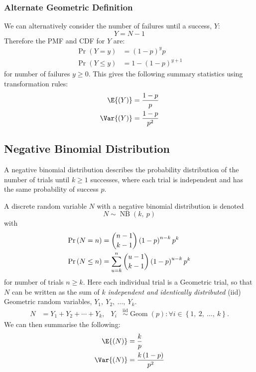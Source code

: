 \documentclass{article}
\begin{document}
\begin{multicols}{3}
    \subsubsection{Alternate Geometric Definition}
    We can alternatively consider the number of failures until a success, \(Y\):
    \begin{equation*}
        Y = N - 1
    \end{equation*}
    Therefore the PMF and CDF for \(Y\) are:
    \begin{align*}
        \Pr{\left( Y = y \right)}    & = \left( 1 - p \right)^y p         \\
        \Pr{\left( Y \leq y \right)} & = 1 - \left( 1 - p \right)^{y + 1}
    \end{align*}
    for number of failures \(y \geq 0\). This gives the following summary statistics using
    transformation rules:
    \begin{align*}
        \E{\left( Y \right)}   & = \frac{1 - p}{p}   \\
        \Var{\left( Y \right)} & = \frac{1 - p}{p^2}
    \end{align*}
    \subsection{Negative Binomial Distribution}
    A negative binomial distribution describes the probability distribution of the number of trials until \(k \geq 1\)
    successes, where each trial is independent and has the same probability of success \(p\).

    A discrete random variable \(N\) with a negative binomial distribution is denoted
    \begin{equation*}
        N \sim \operatorname{NB}{\left( k,\: p \right)}
    \end{equation*}
    with
    \begin{align*}
        \Pr{\left( N = n \right)}    & = \dbinom{n - 1}{k - 1} \left( 1 - p \right)^{n - k} p^k                \\
        \Pr{\left( N \leq n \right)} & = \sum_{u = k}^n \dbinom{u - 1}{k - 1} \left( 1 - p \right)^{u - k} p^k
    \end{align*}
    for number of trials \(n \geq k\).
    Here each individual trial is a Geometric trial, so that \(N\) can be written as the sum of
    \(k\) \textit{independent and identically distributed} (iid) Geometric random variables, \(Y_1,\: Y_2,\: \dots,\: Y_k\).
    \begin{align*}
        N & = Y_1 + Y_2 + \cdots + Y_k, & Y_i & \overset{\mathrm{iid}}{\sim} \operatorname{Geom}{\left( p \right)} : \forall i \in \left\{ 1,\: 2,\: \dots,\: k \right\}.
    \end{align*}
    We can then summarise the following:
    \begin{align*}
        \E{\left( N \right)}   & = \frac{k}{p}                        \\
        \Var{\left( N \right)} & = \frac{k \left( 1 - p \right)}{p^2}
    \end{align*}

\end{multicols}
\end{document}

